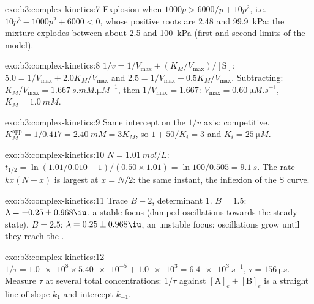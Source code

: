 \begin{solution}{exo:b3:complex-kinetics:7}
Explosion when $1000p > 6000/p + 10p^2$, i.e. $10p^3 - 1000p^2 + 6000 < 0$, whose positive
roots are 2.48 and \qty{99.9}{kPa}: the mixture explodes between about 2.5 and
\qty{100}{kPa} (first and second limits of the model).
\end{solution}

\begin{solution}{exo:b3:complex-kinetics:8}
$1/v = 1/V_{\max} + (K_M/V_{\max})/[\mathrm S]$: $5.0 = 1/V_{\max} + 2.0K_M/V_{\max}$ and $2.5 = 1/V_{\max} + 0.5K_M/V_{\max}$.
Subtracting: $K_M/V_{\max} = \qty{1.667}{s.mM.\micro M^{-1}}$, then $1/V_{\max} = 1.667$: $V_{\max} = \qty{0.60}{\micro M.s^{-1}}$,
$K_M = \qty{1.0}{mM}$.
\end{solution}

\begin{solution}{exo:b3:complex-kinetics:9}
Same intercept on the $1/v$ axis: competitive. $K_M^{\mathrm{app}} = 1/0.417 = \qty{2.40}{mM} = 3K_M$, so
$1 + 50/K_i = 3$ and $K_i = \qty{25}{\micro M}$.
\end{solution}

\begin{solution}{exo:b3:complex-kinetics:10}
$N = \qty{1.01}{mol/L}$: $t_{1/2} = \ln(1.01/0.010 - 1)/(0.50 \times 1.01) = \ln100/0.505 = \qty{9.1}{s}$. The
rate $kx(N - x)$ is largest at $x = N/2$: the same instant, the inflexion of the S
curve.
\end{solution}

\begin{solution}{exo:b3:complex-kinetics:11}
Trace $B - 2$, determinant 1. $B = 1.5$: $\lambda = -0.25 \pm 0.968\iu$, a stable focus (damped
oscillations towards the steady state). $B = 2.5$: $\lambda = 0.25 \pm 0.968\iu$, an unstable focus:
oscillations grow until they reach the .
\end{solution}

\begin{solution}{exo:b3:complex-kinetics:12}
$1/\tau = \num{1.0e8} \times \num{5.40e-5} + \num{1.0e3} = \qty{6.4e3}{s^{-1}}$, $\tau = \qty{156}{\micro s}$. Measure $\tau$ at several
total concentrations: $1/\tau$ against $[\mathrm A]_e + [\mathrm B]_e$ is a straight line of slope $k_1$ and
intercept $k_{-1}$.
\end{solution}

